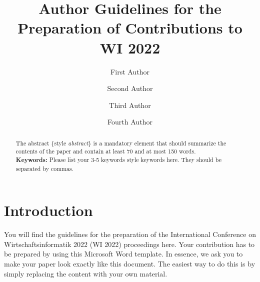 \documentclass{llncs}
\begin{document}
\frontmatter          %

\mainmatter              %


\title{Author Guidelines for the Preparation of Contributions to WI 2022}


\author{First Author \and
Second Author \and
Third Author \and
Fourth Author}


\maketitle
\setcounter{footnote}{0}

\begin{abstract}
The abstract $\{$style \textit{abstract}$\}$ is a mandatory element that should summarize the contents of the paper and contain at least 70 and at most 150 words.\\

{\bfseries Keywords:} Please list your 3-5 keywords {style keywords} here. They should be separated by commas.
\end{abstract}

\thispagestyle{WI_footer}


\section{Introduction}
\label{sec:introduction}

You will find the guidelines for the preparation of the International Conference on Wirtschaftsinformatik 2022 (WI 2022) proceedings here. 
Your contribution has to be prepared by using this Microsoft Word template. 
In essence, we ask you to make your paper look exactly like this document. 
The easiest way to do this is by simply replacing the content with your own material.
\end{document}
